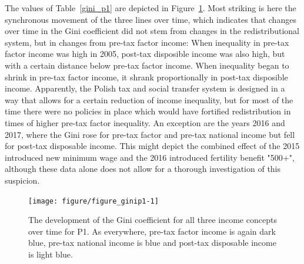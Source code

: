 \documentclass[a4paper]{article}\usepackage[]{graphicx}\usepackage[]{color}
\newenvironment{knitrout}{}{} %
\begin{document}
The values of Table~\ref{gini_p1} are depicted in Figure~\ref{fig:figure_ginip1}. Most striking is here the synchronous movement of the three lines over time, which indicates that changes over time in the Gini coefficient did not stem from changes in the redistributional system, but in changes from pre-tax factor income: When inequality in pre-tax factor income was high in 2005, post-tax disposible income was also high, but with a certain distance below pre-tax factor income. When inequality began to shrink in pre-tax factor income, it shrank proportionally in post-tax disposible income. Apparently, the Polish tax and social transfer system is designed in a way that allows for a certain reduction of income inequality, but for most of the time there were no policies in place which would have fortified redistribution in times of higher pre-tax factor inequality. An exception are the years 2016 and 2017, where the Gini rose for pre-tax factor and pre-tax national income but fell for post-tax disposable income. This might depict the combined effect of the 2015 introduced new minimum wage and the 2016 introduced fertility benefit "500+", although these data alone does not allow for a thorough investigation of this suspicion.      
\begin{knitrout}
\color{fgcolor}\begin{figure}

{\centering \texttt{[image: figure/figure\_ginip1-1]} 

}

\caption[The development of the Gini coefficient for all three income concepts over time for P1]{The development of the Gini coefficient for all three income concepts over time for P1. As everywhere, pre-tax factor income is again dark blue, pre-tax national income is blue and post-tax disposable income is light blue.}\label{fig:figure_ginip1}
\end{figure}


\end{knitrout}
\end{document}
